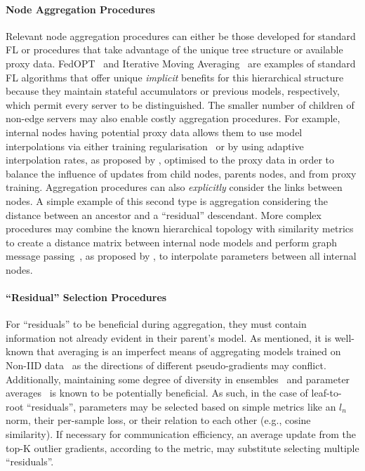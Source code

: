 \paragraph{Node Aggregation Procedures} Relevant node aggregation procedures can either be those developed for standard FL or procedures that take advantage of the unique tree structure or available proxy data. FedOPT~\citep{FedOPT} and Iterative Moving Averaging~\citep{UnderstandingModelAveragingInFL} are examples of standard FL algorithms that offer unique \emph{implicit} benefits for this hierarchical structure because they maintain stateful accumulators or previous models, respectively, which permit every server to be distinguished. The smaller number of children of non-edge servers may also enable costly aggregation procedures.  For example, internal nodes having potential proxy data allows them to use model interpolations via either training regularisation~\citep{Ditto} or by using adaptive interpolation rates, as proposed by \citet{AdaptivePersonalisedFederatedLearning}, optimised to the proxy data in order to balance the influence of updates from child nodes, parents nodes, and
from proxy training. Aggregation procedures can also \emph{explicitly} consider the links between nodes. A simple example of this second type is aggregation considering the distance between an ancestor and a ``residual'' descendant. More complex procedures may combine the known hierarchical topology with similarity metrics to create a distance matrix between internal node models and perform graph message passing~\citep{GNNSurvey}, as proposed by \citet{FederatedLearningWithGraph}, to interpolate parameters between all internal nodes.
\paragraph{``Residual'' Selection Procedures} For ``residuals'' to be beneficial during aggregation, they must contain information not already evident in their parent's model. As mentioned, it is well-known that averaging is an imperfect means of aggregating models trained on Non-IID data~\citep{FedAvg,LargeCohorts,OnTheConvergenceOfFedAvgOnNonIIDdata,FedProx} as the directions of different pseudo-gradients may conflict. Additionally, maintaining some degree of diversity in ensembles~\citep{StochasticMultipleChoiceLearningDiverseEnsembles} and parameter averages~\citep{DiverseWeightAveraging} is known to be potentially beneficial. As such, in the case of leaf-to-root ``residuals'', parameters may be selected based on simple metrics like an $l_n$ norm, their per-sample loss, or their relation to each other (e.g., cosine similarity). If necessary for communication efficiency, an average update from the top-K outlier gradients, according to the metric, may substitute selecting multiple ``residuals''.

